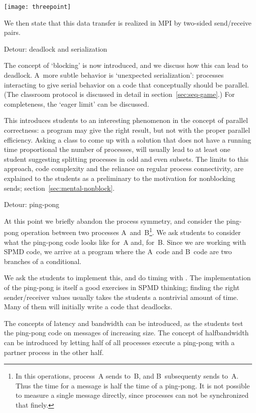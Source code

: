 \texttt{[image: threepoint]}

We then state that this data transfer is realized in MPI by two-sided
send/receive pairs.

 {Detour: deadlock and serialization}
\label{sec:p-serial}

The concept of `blocking' is now introduced, and we discuss how this
can lead to deadlock. A~more subtle behavior is `unexpected
serialization': processes interacting to give serial behavior on a
code that conceptually should be parallel.
(The classroom protocol is discussed in detail in section~\ref{sec:seq-game}.)
For completeness, the `eager limit' can be discussed.

This introduces students to an interesting phenomenon in the concept
of parallel correctness: a program may give the right result,
but not with the proper parallel efficiency.
Asking a class to come up with a solution that does not have a running
time proportional the number of processes, will usually lead to
at least one student suggesting splitting processes in odd and even
subsets. The limits to this approach, code complexity and the reliance
on regular process connectivity, are explained to the students as a
preliminary to the motivation for nonblocking sends; section~\ref{sec:mental-nonblock}.

 {Detour: ping-pong}

At this point we briefly abandon the process symmetry, and consider
the ping-pong operation between two processes A~and~B\footnote {In this
operations, process~A sends to~B, and B~subsequenty sends to~A. Thus
the time for a message is half the time of a ping-pong. It is not
possible to measure a single message directly, since processes can not
be synchronized that finely.}.
We ask students
to consider what the ping-pong code looks like for~A and, for~B.
Since we are working with SPMD code, we arrive at a program where the
A~code and B~code are two branches of a conditional.

We ask the students to implement this, and do timing with
. The implementation of the ping-pong is itself a good
exercises in SPMD thinking; finding the right sender/receiver values
usually takes the students a nontrivial amount of time. Many of them
will initially write a code that deadlocks.

The concepts of latency and bandwidth can be introduced, as the students
test the ping-pong code on messages of increasing size.
The concept of halfbandwidth can be introduced by letting half of all processes
execute a ping-pong with a partner process in the other half.

